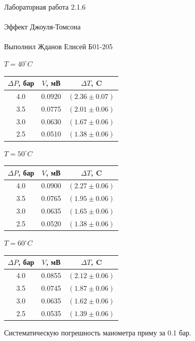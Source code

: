 \documentclass{astroedu-lab}
\begin{document}
\begin{problem}{\huge Лабораторная работа 2.1.6\\\\Эффект Джоуля-Томсона\\\\Выполнил Жданов Елисей Б01-205}
\begin{center}
	$T = 40 ^\circ C$
\end{center}

\begin{center}
\begin{tabular}{|c|c|c|}
\hline
$\Delta P$, бар & $V$, мВ & $\Delta T$, C \\ \hline
4.0 & 0.0920 & $(2.36 \pm 0.07)$ \\
3.5 & 0.0775 & $(2.01 \pm 0.06)$ \\
3.0 & 0.0630 & $(1.67 \pm 0.06)$ \\
2.5 & 0.0510 & $(1.38 \pm 0.06)$ \\
\hline
\end{tabular}
\end{center}

\newpage

\begin{center}
	$T = 50 ^\circ C$
\end{center}

\begin{center}
\begin{tabular}{|c|c|c|}
\hline
$\Delta P$, бар & $V$, мВ & $\Delta T$, C \\ \hline
4.0 & 0.0900 & $(2.27 \pm 0.06)$ \\
3.5 & 0.0765 & $(1.95 \pm 0.06)$ \\
3.0 & 0.0635 & $(1.65 \pm 0.06)$ \\
2.5 & 0.0520 & $(1.38 \pm 0.06)$ \\
\hline
\end{tabular}
\end{center}

\begin{center}
	$T = 60 ^\circ C$
\end{center}

\begin{center}
\begin{tabular}{|c|c|c|}
\hline
$\Delta P$, бар & $V$, мВ & $\Delta T$, C \\ \hline
4.0 & 0.0855 & $(2.12 \pm 0.06)$ \\
3.5 & 0.0745 & $(1.87 \pm 0.06)$ \\
3.0 & 0.0635 & $(1.62 \pm 0.06)$ \\
2.5 & 0.0535 & $(1.39 \pm 0.06)$ \\
\hline
\end{tabular}
\end{center}

Систематическую погрешность манометра приму за 0.1 бар.


\end{problem}
\end{document}

